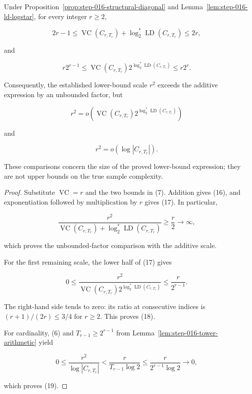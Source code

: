 \begin{proposition}\label{prop:step-016-scale-comparison}
Under Proposition~\ref{prop:step-016-structural-diagonal} and
Lemma~\ref{lem:step-016-ld-logstar}, for every integer \(r\ge2\),

\[
2r-1
\le
\operatorname{VC}(C_{r,T_r})
+\log_2^*\operatorname{LD}(C_{r,T_r})
\le2r,
\tag{16}
\]

and

\[
r2^{r-1}
\le
\operatorname{VC}(C_{r,T_r})
2^{\log_2^*\operatorname{LD}(C_{r,T_r})}
\le r2^r.
\tag{17}
\]

Consequently, the established lower-bound scale \(r^2\) exceeds the
additive expression by an unbounded factor, but

\[
r^2
=o\!\left(
\operatorname{VC}(C_{r,T_r})
2^{\log_2^*\operatorname{LD}(C_{r,T_r})}
\right)
\tag{18}
\]

and

\[
r^2=o(\log|C_{r,T_r}|).
\tag{19}
\]

These comparisons concern the size of the proved lower-bound expression;
they are not upper bounds on the true sample complexity.
\end{proposition}

\begin{proof}
Substitute \(\operatorname{VC}=r\) and the two bounds in (7). Addition
gives (16), and exponentiation followed by multiplication by \(r\) gives
(17). In particular,

\[
\frac{r^2}{
 \operatorname{VC}(C_{r,T_r})
 +\log_2^*\operatorname{LD}(C_{r,T_r})}
\ge\frac r2\longrightarrow\infty,
\]

which proves the unbounded-factor comparison with the additive scale.

For the first remaining scale, the lower half of (17) gives

\[
0\le
\frac{r^2}{
 \operatorname{VC}(C_{r,T_r})
 2^{\log_2^*\operatorname{LD}(C_{r,T_r})}}
\le\frac r{2^{r-1}}.
\tag{20}
\]

The right-hand side tends to zero: its ratio at consecutive indices is
\((r+1)/(2r)\le3/4\) for \(r\ge2\). This proves (18).

For cardinality, (6) and \(T_{r-1}\ge2^{r-1}\) from
Lemma~\ref{lem:step-016-tower-arithmetic} yield

\[
0\le\frac{r^2}{\log|C_{r,T_r}|}
<\frac{r}{T_{r-1}\log2}
\le\frac{r}{2^{r-1}\log2}\longrightarrow0,
\]

which proves (19). \end{proof}
